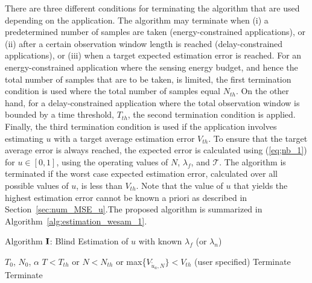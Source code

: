 \documentclass[11pt,draftclsnofoot,journal,onecolumn]{IEEEtran}
\begin{document}
There are three different conditions for terminating the algorithm that are used depending on the application. The algorithm may terminate when (i) a predetermined number of samples are taken (energy-constrained applications), or (ii) after a certain observation window length is reached (delay-constrained applications), or (iii) when a target expected estimation error is reached. For an energy-constrained application where the sensing energy budget, and hence the total number of samples that are to be taken, is limited, the first termination condition is used where the total number of samples equal $N_{th}$. On the other hand, for a delay-constrained application where the total observation window is bounded by a time threshold, $T_{th}$, the second termination condition is applied. Finally, the third termination condition is used if the application involves estimating $u$ with a target average estimation error $V_{th}$. To ensure that the target average error is always reached, the expected error is calculated using (\ref{eq;nb_1}) for $u\in[0,1]$, using the operating values of $N$, $\lambda_f$, and $\mathcal{T}$. The algorithm is terminated if the worst case expected estimation error, calculated over all possible values of $u$, is less than $V_{th}$. Note that the value of $u$ that yields the highest estimation error cannot be known a priori as described in Section~\ref{sec:num_MSE_u}.The proposed algorithm is summarized in Algorithm~\ref{alg:estimation_wesam_1}.

\begin{algorithm}[t]
\centering
\caption{Algorithm $\bf{I}$: Blind Estimation of $u$ with known $\lambda_f$ (or $\lambda_n$)}
\label{alg:estimation_wesam_1}
\begin{algorithmic}[1]
\REQUIRE $T_0$, $N_0$, $\alpha$
\ENSURE $T < T_{th}$ or $N < N_{th}$ or max\{$V_{\tilde{u}_a,N}\}<V_{th}$ (user specified)
	\STATE Terminate
	\ENDIF
\ENDWHILE
{}
	\STATE Terminate
	\ENDIF
\ENDWHILE
{}
\ENDWHILE
\end{algorithmic}
\end{algorithm}
\end{document}
